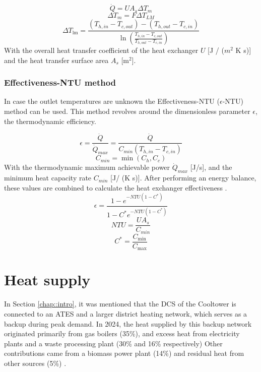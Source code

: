 \begin{equation}\label{eq::newtoncooling}
    \dot{Q} =  U A_{s} \Delta T_{m}
\end{equation}
\begin{equation}
    \Delta T_m = F \Delta T_{LM}
\end{equation}
\begin{equation}\label{eq::LMTD}
\Delta T_{\operatorname{lm}}=\frac{(T_{h,in} - T_{c,out}) - (T_{h,out} - T_{c,in})}{\ln \left(\frac{T_{h,in} - T_{c,out}}{T_{h,out} - T_{c,in}}\right)}
\end{equation}
With the overall heat transfer coefficient of the heat exchanger $U$ [J / ($m^2$ K  s)] and the heat transfer surface area $A_{s}$ [m$^2$].

\subsubsection{Effectiveness-NTU method}
In case the outlet temperatures are unknown the Effectiveness-NTU ($\epsilon$-NTU) method can be used. This method revolves around the dimensionless parameter $\epsilon$, the thermodynamic efficiency. 

\begin{equation}\label{eq::epsilon}
    \epsilon = \frac{\dot{Q}}{\dot{Q}_{max}} = \frac{\dot{Q}}{{C}_{min}(T_{h,in} - T_{c,in})}
\end{equation}
\begin{equation}
    C_{min} = \min(C_h, C_c)
\end{equation}
With the thermodynamic maximum achievable power $\dot{Q}_{max}$ [J/s], and the minimum heat capacity rate $C_{min}$ [J/ (K s)]. After performing an energy balance, these values are combined to calculate the heat exchanger effectiveness \cite{cengel2025heat}.
\begin{equation}
    \epsilon = \frac{1 - e^{-NTU  (1 - C^*)}}{1 - C^*  e^{-NTU (1 - C^*)}}
\end{equation}
\begin{equation}
    NTU = \frac{U A_s}{C_{min}}
\end{equation}
\begin{equation}
    C^{*} = \frac{C_{\min}}{C_{\max}}
\end{equation}

\section{Heat supply}
In Section \ref{chap::intro}, it was mentioned that the DCS of the Cooltower is connected to an ATES and a larger district heating network, which serves as a backup during peak demand. In 2024, the heat supplied by this backup network originated primarily from gas boilers (35\%), and excess heat from electricity plants and a waste processing plant (30\% and 16\% respectively) Other contributions came from a biomass power plant (14\%) and residual heat from other sources (5\%) \cite{heatsupply}. 

